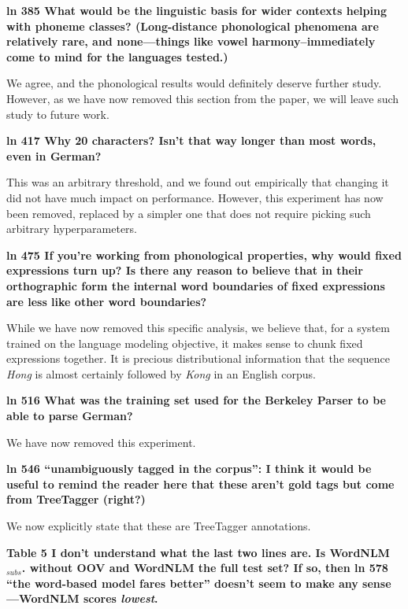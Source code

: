 \documentclass{article}
\begin{document}
\textbf{ln 385 What would be the linguistic basis for wider contexts helping with phoneme classes? (Long-distance phonological phenomena are relatively rare, and none---things like vowel harmony--immediately come to mind for the languages tested.)}

We agree, and the phonological results would definitely deserve further study. However, as we have now removed this section from the paper, we will leave such study to future work.
\newline

\textbf{ln 417 Why 20 characters? Isn't that way longer than most words, even in German?}

This was an arbitrary threshold, and we found out empirically that changing it did not have much impact on performance. However, this experiment has now been removed, replaced by a simpler one that does not require picking such arbitrary hyperparameters.
\newline

\textbf{ln 475 If you're working from phonological properties, why would fixed expressions turn up? Is there any reason to believe that in their orthographic form the internal word boundaries of fixed expressions are less like other word boundaries?}

While we have now removed this specific analysis, we believe that, for a system trained on the language modeling objective, it makes sense to chunk fixed expressions together. It is precious distributional information that the sequence \textit{Hong} is almost certainly followed by \textit{Kong} in an English corpus.
\newline

\textbf{ln 516 What was the training set used for the Berkeley Parser to be able to parse German?}

We have now removed this experiment.
\newline

\textbf{ln 546 ``unambiguously tagged in the corpus'':  I think it would be useful to remind the reader here that these aren't gold tags but come from TreeTagger (right?)}

We now explicitly state that these are TreeTagger annotations.
\newline

\textbf{Table 5 I don't understand what the last two lines are. Is WordNLM$_{subs}$. without OOV and WordNLM the full test set? If so, then ln 578 ``the word-based model fares better'' doesn't seem to make any sense---WordNLM scores \emph{lowest}.}
\end{document}
